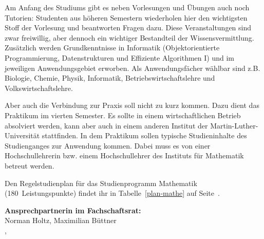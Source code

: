 Am Anfang des Studiums gibt es neben Vorlesungen und Übungen auch noch Tutorien:
Studenten aus höheren Semestern wiederholen hier den wichtigsten Stoff der Vorlesung und beantworten Fragen dazu.
Diese Veranstaltungen sind zwar freiwillig, aber dennoch ein wichtiger Bestandteil der Wissensvermittlung.
Zusätzlich werden Grundkenntnisse in Informatik (Objektorientierte Programmierung, Datenstrukturen und Effiziente Algorithmen I) und im jeweiligen Anwendungsgebiet erworben. 
Als Anwendungsfächer wählbar sind z.B. Biologie, Chemie, Physik, Informatik, Betriebswirtschaftslehre und Volkswirtschaftslehre.

Aber auch die Verbindung zur Praxis soll nicht zu kurz kommen.
Dazu dient das Praktikum im vierten Semester.
Es sollte in einem wirtschaftlichen Betrieb absolviert werden, kann aber auch in einem anderen Institut der Martin-Luther-Universität stattfinden.
In dem Praktikum sollen typische Studieninhalte des Studienganges zur Anwendung kommen.
Dabei muss es von einer Hochschullehrerin bzw. einem Hochschullehrer des Instituts für Mathematik betreut werden.

Den Regelstudienplan für das Studienprogramm Mathematik (180~Leistungspunkte) findet ihr in Tabelle~\ref{plan-mathe} auf Seite~\pageref{plan-mathe}.

\textbf{Ansprechpartnerin im Fachschaftsrat:}\\
Norman Holtz, Maximilian Büttner\\
,\\
\\



